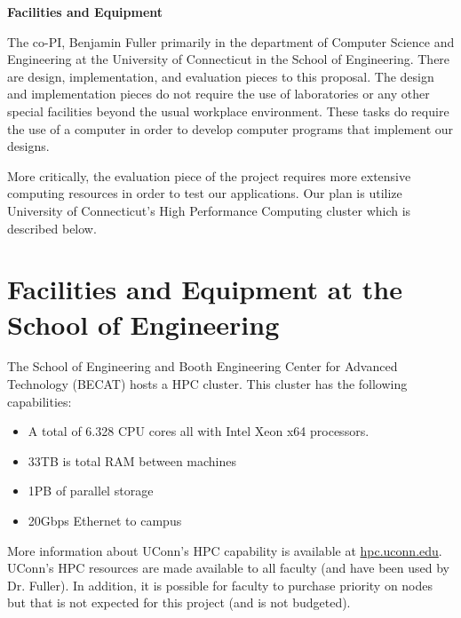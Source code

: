 \documentclass[11pt]{article}
\begin{document}
\newcommand{\etalchar}[1]{$^{#1}$}

$\mbox{ }$


\begin{center}
{\Large \bf Facilities and Equipment}
\end{center}




The co-PI, Benjamin Fuller primarily in the department of Computer Science and Engineering at the University of Connecticut in the School of Engineering.   There are design, implementation, and evaluation pieces to this proposal.  The design and implementation pieces do not require the use of laboratories or any other special facilities beyond the usual workplace environment. These tasks do require the use of a computer in order to develop computer programs that implement our designs. 

More critically, the evaluation piece of the project requires more extensive computing resources in order to test our applications. Our plan is utilize University of Connecticut's High Performance Computing cluster which is described below.

\noindent
\section*{Facilities and Equipment at the School of Engineering}

The School of Engineering and Booth Engineering Center for Advanced Technology (BECAT) hosts a HPC cluster. This cluster has the following capabilities:

\begin{itemize}
\item A total of 6.328 CPU cores all with Intel Xeon x64 processors.
\item 33TB is total RAM between machines
\item 1PB of parallel storage
\item 20Gbps Ethernet to campus
\end{itemize}

More information about UConn's HPC capability is available at \url{hpc.uconn.edu}.  UConn's HPC resources are made available to all faculty (and have been used by Dr. Fuller).  In addition, it is possible for faculty to purchase priority on nodes but that is not expected for this project (and is not budgeted).

\noindent
\end{document}
